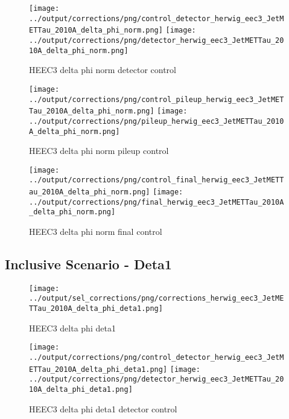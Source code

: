 \documentclass[11pt]{book}
\begin{document}
\begin{figure}[ht]
\centering
\texttt{[image: ../output/corrections/png/control\_detector\_herwig\_eec3\_JetMETTau\_2010A\_delta\_phi\_norm.png]}
\texttt{[image: ../output/corrections/png/detector\_herwig\_eec3\_JetMETTau\_2010A\_delta\_phi\_norm.png]}
\caption{HEEC3 delta phi norm detector control}
\label{fig:HEEC3_JetMETTau_2010A_delta_phi_norm_detector_control}
\end{figure}

\begin{figure}[ht]
\centering
\texttt{[image: ../output/corrections/png/control\_pileup\_herwig\_eec3\_JetMETTau\_2010A\_delta\_phi\_norm.png]}
\texttt{[image: ../output/corrections/png/pileup\_herwig\_eec3\_JetMETTau\_2010A\_delta\_phi\_norm.png]}
\caption{HEEC3 delta phi norm pileup control}
\label{fig:HEEC3_JetMETTau_2010A_delta_phi_norm_pileup_control}
\end{figure}


\begin{figure}[ht]
\centering
\texttt{[image: ../output/corrections/png/control\_final\_herwig\_eec3\_JetMETTau\_2010A\_delta\_phi\_norm.png]}
\texttt{[image: ../output/corrections/png/final\_herwig\_eec3\_JetMETTau\_2010A\_delta\_phi\_norm.png]}
\caption{HEEC3 delta phi norm final control}
\label{fig:HEEC3_JetMETTau_2010A_delta_phi_norm_final_control}
\end{figure}

\clearpage
\subsection{Inclusive Scenario - Deta1}

\begin{figure}[ht]
\centering
\texttt{[image: ../output/sel\_corrections/png/corrections\_herwig\_eec3\_JetMETTau\_2010A\_delta\_phi\_deta1.png]}
\caption{HEEC3 delta phi deta1}
\label{fig:HEEC3_JetMETTau_2010A_delta_phi_deta1}
\end{figure}


\begin{figure}[ht]
\centering
\texttt{[image: ../output/corrections/png/control\_detector\_herwig\_eec3\_JetMETTau\_2010A\_delta\_phi\_deta1.png]}
\texttt{[image: ../output/corrections/png/detector\_herwig\_eec3\_JetMETTau\_2010A\_delta\_phi\_deta1.png]}
\caption{HEEC3 delta phi deta1 detector control}
\label{fig:HEEC3_JetMETTau_2010A_delta_phi_deta1_detector_control}
\end{figure}
\end{document}
